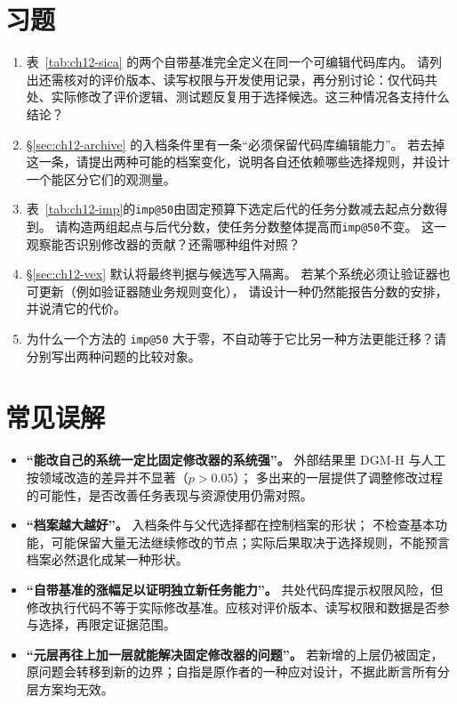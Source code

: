 
\section*{习题}
\begin{enumerate}[label=12-\arabic*.,ref=12-\arabic*]
  \item\label{ex:ch12-1} 表~\ref{tab:ch12-sica} 的两个自带基准完全定义在同一个可编辑代码库内。
        请列出还需核对的评价版本、读写权限与开发使用记录，再分别讨论：仅代码共处、实际修改了评价逻辑、测试题反复用于选择候选。这三种情况各支持什么结论？
  \item\label{ex:ch12-2} \S\ref{sec:ch12-archive} 的入档条件里有一条“必须保留代码库编辑能力”。
        若去掉这一条，请提出两种可能的档案变化，说明各自还依赖哪些选择规则，并设计一个能区分它们的观测量。
  \item\label{ex:ch12-3} 表~\ref{tab:ch12-imp}的\texttt{imp@50}由固定预算下选定后代的任务分数减去起点分数得到。
        请构造两组起点与后代分数，使任务分数整体提高而\texttt{imp@50}不变。
        这一观察能否识别修改器的贡献？还需哪种组件对照？
  \item\label{ex:ch12-4} \S\ref{sec:ch12-vex} 默认将最终判据与候选写入隔离。
        若某个系统必须让验证器也可更新（例如验证器随业务规则变化），
        请设计一种仍然能报告分数的安排，并说清它的代价。
  \item\label{ex:ch12-5} 为什么一个方法的 \texttt{imp@50} 大于零，不自动等于它比另一种方法更能迁移？请分别写出两种问题的比较对象。
\end{enumerate}

\section*{常见误解}
\begin{itemize}
  \item \textbf{“能改自己的系统一定比固定修改器的系统强”。}
        外部结果里 DGM-H 与人工按领域改造的差异并不显著（$p>0.05$）；
        多出来的一层提供了调整修改过程的可能性，是否改善任务表现与资源使用仍需对照。
  \item \textbf{“档案越大越好”。}
        入档条件与父代选择都在控制档案的形状；
        不检查基本功能，可能保留大量无法继续修改的节点；实际后果取决于选择规则，不能预言档案必然退化成某一种形状。
  \item \textbf{“自带基准的涨幅足以证明独立新任务能力”。}
        共处代码库提示权限风险，但修改执行代码不等于实际修改基准。应核对评价版本、读写权限和数据是否参与选择，再限定证据范围。
  \item \textbf{“元层再往上加一层就能解决固定修改器的问题”。}
        若新增的上层仍被固定，原问题会转移到新的边界；自指是原作者的一种应对设计，不据此断言所有分层方案均无效。
\end{itemize}

